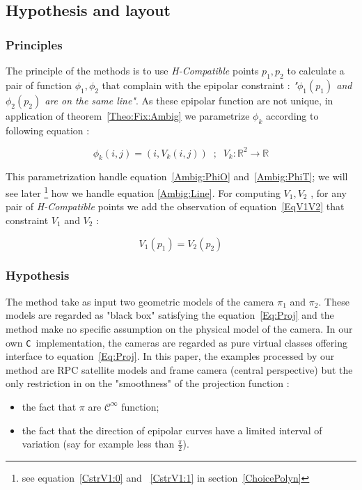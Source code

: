 \documentclass{ipol}
\newcommand{\CPP}{\mbox{\tt C\hspace{-0.05cm}\raisebox{0.2ex}{\small ++} }}
\newcommand{\RR}{\ensuremath{\mathbb{R}}}
\begin{document}
\subsection{Hypothesis and layout}

\subsubsection{Principles}
The principle of the methods is to use \emph{H-Compatible}  points $p_1,p_2$ to calculate a
pair of function $\phi_1,\phi_2$ that complain with the epipolar constraint :
\emph{"$\phi_1(p_1)$ and $\phi_2(p_2)$ are on the same line"}. As these epipolar function
are not unique, in application of theorem~\ref{Theo:Fix:Ambig} we  parametrize $\phi_k$ according to following equation :


\begin{equation}
    \phi_k(i,j) = (i,V_k(i,j))  \; \; ; \; \;
    V_k : \RR^2 \rightarrow \RR  
  \label{EpipVParam}
\end{equation}

This parametrization handle  equation~\ref{Ambig:PhiO} and~\ref{Ambig:PhiT}; 
we will see later \footnote{see equation~\ref{CstrV1:0} and ~\ref{CstrV1:1} in section~\ref{ChoicePolyn}}
how we handle equation \ref{Ambig:Line}.
For  computing $V_1,V_2$ , for any pair of \emph{H-Compatible} points we add the observation
of equation~\ref{EqV1V2} that constraint $V_1$ and $V_2$ :


\begin{equation}
    V_1(p_1) = V_2(p_2) \label{EqV1V2}
\end{equation}

\subsubsection{Hypothesis}


The method take as input two geometric models of the camera $\pi_1$ and $\pi_2$.
These models are regarded as "black box" satisfying the equation~\ref{Eq:Proj} and the method 
make no specific assumption on the physical model of the camera. In our own \CPP implementation,
the cameras are regarded as pure virtual classes offering interface to equation~\ref{Eq:Proj}.
In this paper, the examples processed by our method are RPC satellite models and frame camera (central perspective) but the
only restriction in on the "smoothness" of the projection function :

\begin{itemize}
    \item the fact that $\pi$ are   $\mathcal{C}^{\infty}$ function;
    \item the fact that the direction of epipolar curves have a limited interval of variation (say for example
          less than $\frac{\pi}{2}$).
\end{itemize}
\end{document}
